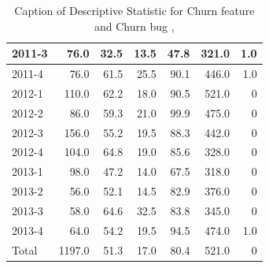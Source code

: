 \documentclass[UKenglish]{ifimaster}  %
\begin{document}
\begin{appendices}
\begin{table}[!htbp]
\begin{adjustwidth}{-1.5cm}{}
{{\begin{tabular}{ | l | r | r | r | r | r | r | }
2011-3 & 76.0 & 32.5 & 13.5 & 47.8 & 321.0 & 1.0\\ \hline
2011-4 & 76.0 & 61.5 & 25.5 & 90.1 & 446.0 & 1.0\\ \hline
2012-1 & 110.0 & 62.2 & 18.0 & 90.5 & 521.0 & 0\\ \hline
2012-2 & 86.0 & 59.3 & 21.0 & 99.9 & 475.0 & 0\\ \hline
2012-3 & 156.0 & 55.2 & 19.5 & 88.3 & 442.0 & 0\\ \hline
2012-4 & 104.0 & 64.8 & 19.0 & 85.6 & 328.0 & 0\\ \hline
2013-1 & 98.0 & 47.2 & 14.0 & 67.5 & 318.0 & 0\\ \hline
2013-2 & 56.0 & 52.1 & 14.5 & 82.9 & 376.0 & 0\\ \hline
2013-3 & 58.0 & 64.6 & 32.5 & 83.8 & 345.0 & 0\\ \hline
2013-4 & 64.0 & 54.2 & 19.5 & 94.5 & 474.0 & 1.0\\ \hline
Total & 1197.0 & 51.3 & 17.0 & 80.4 & 521.0 & 0\\ \hline
\end{tabular}
}
}
\end{adjustwidth}
\caption[Optional caption for list of figures]{Caption of Descriptive Statistic for Churn feature and Churn bug , }
\label{DS:2:4}
\end{table}






\end{appendices}
\end{document}
